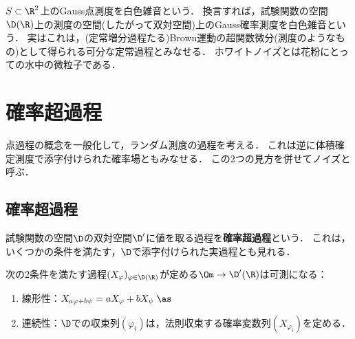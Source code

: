 \documentclass[uplatex,dvipdfmx]{jsreport}
\begin{document}
\begin{tcolorbox}[colframe=ForestGreen, colback=ForestGreen!10!white,breakable,colbacktitle=ForestGreen!40!white,coltitle=black,fonttitle=\bfseries\sffamily,
title=]
    $S\subset\R^2$上のGauss点測度を白色雑音という．
    換言すれば，試験関数の空間$\D(\R)$上の測度の空間(したがって双対空間)上のGauss確率測度を白色雑音という．
    実はこれは，(定常増分過程たる)Brown運動の超関数微分(測度のようなもの)として得られる可分な定常過程とみなせる．
    ホワイトノイズとは花粉にとっての水中の微粒子である．
\end{tcolorbox}

\section{確率超過程}

\begin{tcolorbox}[colframe=ForestGreen, colback=ForestGreen!10!white,breakable,colbacktitle=ForestGreen!40!white,coltitle=black,fonttitle=\bfseries\sffamily,
title=]
    点過程の概念を一般化して，ランダム測度の過程を考える．
    これは逆に体積確定測度で添字付けられた確率場ともみなせる．
    この2つの見方を併せてノイズと呼ぶ．
\end{tcolorbox}

\subsection{確率超過程}

\begin{tcolorbox}[colframe=ForestGreen, colback=ForestGreen!10!white,breakable,colbacktitle=ForestGreen!40!white,coltitle=black,fonttitle=\bfseries\sffamily,
title=]
    試験関数の空間$\D$の双対空間$\D'$に値を取る過程を\textbf{確率超過程}という．
    これは，いくつかの条件を満たす，$\D$で添字付けられた実過程とも見れる．
\end{tcolorbox}

\begin{lemma}
    次の2条件を満たす過程$(X_\varphi)_{\varphi\in\D(\R)}$が定める$\Om\to\D'(\R)$は可測になる：
    \begin{enumerate}
        \item 線形性：$X_{a\varphi+b\psi}=aX_\varphi+bX_\psi\;\as$
        \item 連続性：$\D$での収束列$(\varphi_i)$は，法則収束する確率変数列$(X_{\varphi_i})$を定める．
    \end{enumerate}
\end{lemma}
\end{document}
